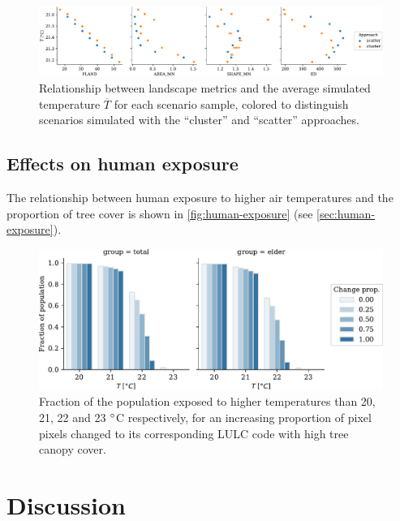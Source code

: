 \documentclass[12pt]{iopart}
\begin{document}
\begin{figure}
  \centering
  \includegraphics[width=\textwidth]{figures/scenarios-config}
  \caption{\label{fig:scenarios-config} Relationship between landscape metrics and the average simulated temperature $\overline{T}$ for each scenario sample, colored to distinguish scenarios simulated with the ``cluster'' and ``scatter'' approaches.}
\end{figure}

\subsection{Effects on human exposure}

The relationship between human exposure to higher air temperatures and the proportion of tree cover is shown in \autoref{fig:human-exposure} (see \ref{sec:human-exposure}).

\begin{figure}[ht]
  \centering
  \includegraphics[width=\textwidth]{figures/human-exposure}
  \caption{\label{fig:human-exposure} Fraction of the population exposed to higher temperatures than 20, 21, 22 and 23 $\degree$C respectively, for an increasing proportion of pixel pixels changed to its corresponding LULC code with high tree canopy cover.}
\end{figure}


\section{Discussion}
\end{document}
